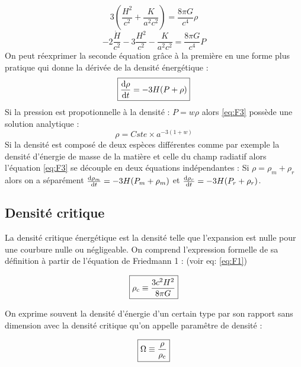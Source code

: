 \documentclass[10pt, a4paper]{report}
\numberwithin{equation}{subsection}
\begin{document}
\begin{equation} \label{eq:F1}
\boxed{3 \left(\frac{H^2}{c^2} + \frac{K}{a^2 c^2} \right) = \frac{8 \pi G}{c^4} \rho}
\end{equation}
\begin{equation} \label{eq:F2}
\boxed{- 2 \frac{\dot H}{c^2} - 3 \frac{H^2}{c^2} - \frac{K}{a^2 c^2} =  \frac{8 \pi G}{c^4} P }
\end{equation}
On peut réexprimer la seconde équation grâce à la première en une forme plus pratique qui donne la dérivée de la densité énergétique :
\begin{equation} \label{eq:F3}
\boxed{\frac{{\rm d}\rho}{{\rm d}t} = - 3 H (P + \rho) }
\end{equation}
Si la pression est propotionnelle à la densité : $P= w \rho$ alors \ref{eq:F3} possède une solution analytique :
\begin{equation} \label{eq:F3S}
\boxed{\rho = Cste \times a^{-3(1+w)}}
\end{equation}
Si la densité est composé de deux espèces différentes comme par exemple la densité d'énergie de masse de la matière et celle du champ radiatif alors l'équation \ref{eq:F3} se découple en deux équations indépendantes : Si $\rho = \rho_m + \rho_r$ alors on a séparément $\frac{{\rm d}\rho_m}{{\rm d}t} = - 3 H (P_m + \rho_m) $ et $\frac{{\rm d}\rho_r}{{\rm d}t} = - 3 H (P_r + \rho_r)$.



\subsection{Densité critique}
La densité critique énergétique est la densité telle que l'expansion est nulle pour une courbure nulle ou négligeable. On comprend l'expression formelle de sa définition à partir de l'équation de Friedmann 1 : (voir eq: \ref{eq:F1})

\begin{equation} \label{eq:DEC}
\boxed{\rho_{\rm c} \equiv \frac{3 c^2 H^2 }{8 \pi G} }
\end{equation}

On exprime souvent la densité d'énergie d'un certain type par son rapport sans dimension avec la densité critique qu'on appelle paramêtre de densité :

\begin{equation} \label{eq:OD}
\boxed{\Omega \equiv \frac{\rho}{\rho_{\rm c}} }
\end{equation}
\end{document}
